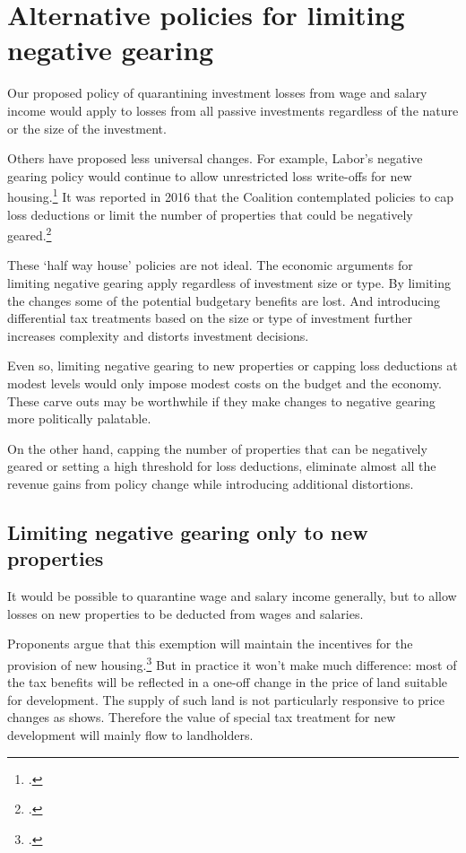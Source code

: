 \section{Alternative policies for limiting negative gearing}
Our proposed policy of quarantining investment losses from wage and salary income would apply to losses from all passive investments regardless of the nature or the size of the investment. 

Others have proposed less universal changes. For example, Labor’s negative gearing policy would continue to allow unrestricted loss write-offs for new housing.\footcite{ALP2016PositivePlanHousing} It was reported in 2016 that the Coalition contemplated policies to cap loss deductions or limit the number of properties that could be negatively geared.\footcite{Coorey2016}  

These ‘half way house’ policies are not ideal. The economic arguments for limiting negative gearing apply regardless of investment size or type. By limiting the changes some of the potential budgetary benefits are lost. And introducing differential tax treatments based on the size or type of investment further increases complexity and distorts investment decisions. 

Even so, limiting negative gearing to new properties or capping loss deductions at modest levels would only impose modest costs on the budget and the economy. These carve outs may be worthwhile if they make changes to negative gearing more politically palatable.

On the other hand, capping the number of properties that can be negatively geared or setting a high threshold for loss deductions, eliminate almost all the revenue gains from policy change while introducing additional distortions. 

\subsection{Limiting negative gearing only to new properties}
It would be possible to quarantine wage and salary income generally, but to allow losses on new properties to be deducted from wages and salaries. 

Proponents argue that this exemption will maintain the incentives for the provision of new housing.\footcite[][28]{McKellInstitute2015SwitchingGears}  But in practice it won’t make much difference: most of the tax benefits will be reflected in a one-off change in the price of land suitable for development. The supply of such land is not particularly responsive to price changes as  shows. Therefore the value of special tax treatment for new development will mainly flow to landholders. 

